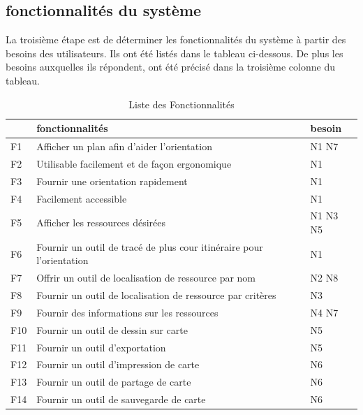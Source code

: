 \documentclass[
    iai, %
    il, %
]{heig-tb}
\begin{document}
\subsection{fonctionnalités du système}
La troisième étape est de déterminer les fonctionnalités du système à partir des besoins des utilisateurs.
Ils ont été listés dans le tableau ci-dessous.
De plus les besoins auxquelles ils répondent, ont été précisé dans la troisième colonne du tableau.
\begin{table}[H]
    \begin{center}
        \caption{Liste des Fonctionnalités \label{fonctions}}
        \begin{tabular}{l|l|l}
                & fonctionnalités                                                      & besoin   \\ \hline
            F1  & Afficher un plan afin d'aider l'orientation                          & N1 N7    \\
            F2  & Utilisable facilement et de façon ergonomique                        & N1       \\
            F3  & Fournir une orientation rapidement                                   & N1       \\
            F4  & Facilement accessible                                                & N1       \\
            F5  & Afficher les ressources désirées                                     & N1 N3 N5 \\
            F6  & Fournir un outil de tracé de plus cour itinéraire pour l'orientation & N1       \\
            F7  & Offrir un outil de localisation de ressource par nom                 & N2 N8    \\
            F8  & Fournir un outil de localisation de ressource par critères           & N3       \\
            F9  & Fournir des informations sur les ressources                          & N4 N7    \\
            F10 & Fournir un outil de dessin sur carte                                 & N5       \\
            F11 & Fournir un outil d'exportation                                       & N5       \\
            F12 & Fournir un outil d'impression de carte                               & N6       \\
            F13 & Fournir un outil de partage de carte                                 & N6       \\
            F14 & Fournir un outil de sauvegarde de carte                              & N6
        \end{tabular}
    \end{center}
\end{table}
\end{document}
